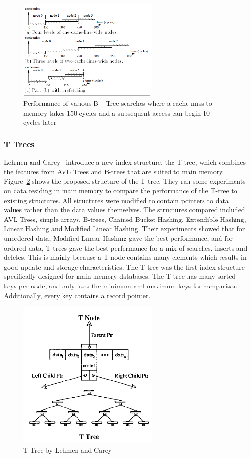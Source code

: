 \documentclass[12pt,a4paper]{article}
\begin{document}
\begin{figure}[!t]
\centering
\includegraphics[width=7cm]{figs/prefetching.png}
\caption{Performance of various B+ Tree searches where a cache miss to memory takes 150 cycles and a subsequent access can begin 10 cycles
later~\cite{chen2001improving}}
\label{fig:prefetching}
\end{figure}

\subsubsection*{T Trees}
Lehmen and Carey~\cite{lehman1986study} introduce a new index structure, the T-tree, which combines the features from AVL Trees and B-trees that are suited to
main memory. Figure~\ref{fig:ttree} shows the proposed structure of the T-tree. They ran some experiments on data residing in main memory to compare the
performance of the T-tree to existing structures. All structures were modified to contain pointers to data values rather than the data values themselves. The
structures compared included  AVL Trees, simple arrays, B-trees, Chained Bucket Hashing, Extendible Hashing, Linear Hashing and Modified Linear Hashing. Their
experiments showed that for unordered data, Modified Linear Hashing gave the best performance, and for ordered data, T-trees gave the best performance for a mix
of searches, inserts and deletes. This is mainly because a T node contains many elements which results in good update and storage characteristics. The T-tree
was the first index structure specifically designed for main memory databases. The T-tree has many sorted keys per node, and only uses the minimum and maximum
keys for comparison. Additionally, every key contains a record pointer.



\begin{figure}[!t]
\centering
\includegraphics[width=7cm]{figs/Ttree.png}
\caption{T Tree by Lehmen and Carey~\cite{lehman1986study}}
\label{fig:ttree}
\end{figure}
\end{document}
